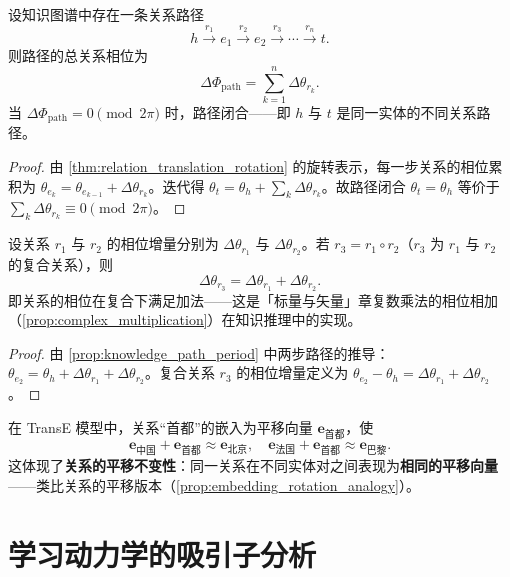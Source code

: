 \begin{proposition}[知识推理的路径周期]\label{prop:knowledge_path_period}
设知识图谱中存在一条关系路径
\[
h\xrightarrow{r_1}e_1\xrightarrow{r_2}e_2\xrightarrow{r_3}\cdots\xrightarrow{r_n}t.
\]
则路径的总关系相位为
\[
\Delta\Phi_{\text{path}}=\sum_{k=1}^n\Delta\theta_{r_k}.
\]
当 $\Delta\Phi_{\text{path}}=0\pmod{2\pi}$ 时，路径闭合——即 $h$ 与 $t$ 是同一实体的不同关系路径。
\end{proposition}

\begin{proof}
由 \cref{thm:relation_translation_rotation} 的旋转表示，每一步关系的相位累积为 $\theta_{e_{k}}=\theta_{e_{k-1}}+\Delta\theta_{r_k}$。迭代得 $\theta_t=\theta_h+\sum_k\Delta\theta_{r_k}$。故路径闭合 $\theta_t=\theta_h$ 等价于 $\sum_k\Delta\theta_{r_k}\equiv0\pmod{2\pi}$。
\end{proof}

\begin{lemma}[传递关系的相位合成]\label{lem:transitive_relation_phase}
设关系 $r_1$ 与 $r_2$ 的相位增量分别为 $\Delta\theta_{r_1}$ 与 $\Delta\theta_{r_2}$。若 $r_3=r_1\circ r_2$（$r_3$ 为 $r_1$ 与 $r_2$ 的复合关系），则
\[
\Delta\theta_{r_3}=\Delta\theta_{r_1}+\Delta\theta_{r_2}.
\]
即关系的相位在复合下满足加法——这是「标量与矢量」章复数乘法的相位相加（\cref{prop:complex_multiplication}）在知识推理中的实现。
\end{lemma}

\begin{proof}
由 \cref{prop:knowledge_path_period} 中两步路径的推导：$\theta_{e_2}=\theta_h+\Delta\theta_{r_1}+\Delta\theta_{r_2}$。复合关系 $r_3$ 的相位增量定义为 $\theta_{e_2}-\theta_h=\Delta\theta_{r_1}+\Delta\theta_{r_2}$。
\end{proof}

\begin{example}\label{ex:transe_translation}
在 TransE 模型中，关系“首都”的嵌入为平移向量 $\mathbf{e}_{\text{首都}}$，使
\[
\mathbf{e}_{\text{中国}}+\mathbf{e}_{\text{首都}}\approx\mathbf{e}_{\text{北京}},\quad
\mathbf{e}_{\text{法国}}+\mathbf{e}_{\text{首都}}\approx\mathbf{e}_{\text{巴黎}}.
\]
这体现了\textbf{关系的平移不变性}：同一关系在不同实体对之间表现为\textbf{相同的平移向量}——类比关系的平移版本（\cref{prop:embedding_rotation_analogy}）。
\end{example}

\section{学习动力学的吸引子分析}
\label{sec:learning_attractor_analysis}

